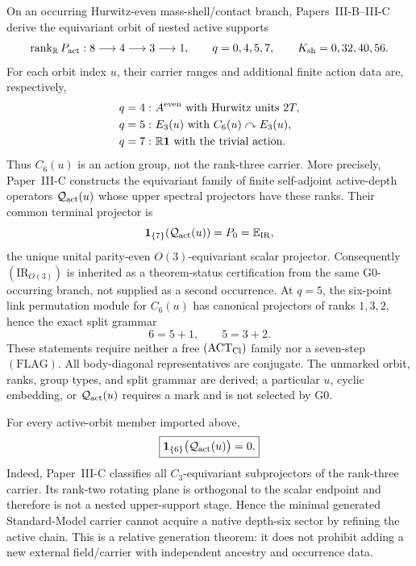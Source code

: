\documentclass[12pt,a4paper]{article}
\begin{document}
\begin{theorem}
\label{p5:thm:derived-active-realization-handoff}
On an occurring Hurwitz-even mass-shell/contact branch, Papers~III-B--III-C
derive the equivariant orbit of nested active supports
\[
 \operatorname{rank}_{\mathbb R}P_{\rm act}:8\longrightarrow4
 \longrightarrow3\longrightarrow1,
 \qquad
 q=0,4,5,7,
 \qquad
 K_{\rm sh}=0,32,40,56.
\]
For each orbit index \(u\), their carrier ranges and additional finite action
data are, respectively,
\[
\begin{aligned}
 q=4:&\ A^{\rm even}\text{ with Hurwitz units }2T,\\
 q=5:&\ E_3(u)\text{ with }C_6(u)\curvearrowright E_3(u),\\
 q=7:&\ \mathbb R\mathbf1\text{ with the trivial action}.
\end{aligned}
\]
Thus \(C_6(u)\) is an action group, not the rank-three carrier.  More
precisely, Paper~III-C constructs the equivariant family of finite
self-adjoint active-depth operators \(\mathcal Q_{\rm act}(u)\) whose upper
spectral projectors have these ranks.  Their common terminal projector is
\[
 \mathbf1_{\{7\}}(\mathcal Q_{\rm act}(u))
 =P_0=\mathbb E_{\rm IR},
\]
the unique unital parity-even \(O(3)\)-equivariant scalar projector.
Consequently \((\mathrm{IR}_{O(3)})\) is inherited as a theorem-status
certification from the same G0-occurring branch, not supplied as a second
occurrence.
At \(q=5\), the six-point link permutation module for \(C_6(u)\) has
canonical projectors of ranks \(1,3,2\), hence the exact split grammar
\[
 \boxed{6=5+1,\qquad5=3+2}.
\]
These statements require neither a free \((\mathrm{ACT}_{\rm Cl})\) family
nor a seven-step \((\mathrm{FLAG})\).  All body-diagonal representatives are
conjugate.  The unmarked orbit, ranks, group types, and split grammar are
derived; a particular \(u\), cyclic embedding, or
\(\mathcal Q_{\rm act}(u)\) requires a mark and is not selected by G0.
\end{theorem}

\begin{corollary}
\label{p5:cor:no-native-depth-six-carrier}
For every active-orbit member imported above,
\begin{equation}
 \label{p5:eq:no-native-depth-six-carrier}
 \boxed{\mathbf1_{\{6\}}\bigl(\mathcal Q_{\rm act}(u)\bigr)=0.}
\end{equation}
Indeed, Paper~III-C classifies all \(C_3\)-equivariant subprojectors of the
rank-three carrier.  Its rank-two rotating plane is orthogonal to the scalar
endpoint and therefore is not a nested upper-support stage.  Hence the
minimal generated Standard-Model carrier cannot acquire a native depth-six
sector by refining the active chain.  This is a relative generation theorem:
it does not prohibit adding a new external field/carrier with independent
ancestry and occurrence data.
\end{corollary}
\end{document}

